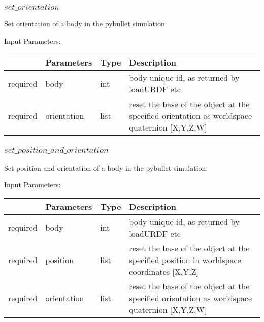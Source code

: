 \documentclass[
	ngerman,
	accentcolor=9c,%
	type=intern,
	marginpar=false
	]{tudapub}
\begin{document}
\vspace{1cm}

\subsubsection{$set\_orientation$}
\noindent Set orientation of a body in the pybullet simulation.

\vspace{0.5cm}
\noindent Input Parameters:
\vspace{0.5cm}

\begin{tabular}{|p{}|p{}|p{}| p{}|}
\hline
 & \textbf{Parameters} & \textbf{Type} & \textbf{Description} \\
\hline
required & body & int & body unique id, as returned by loadURDF etc \\
\hline
required & orientation & list & reset  the base of the object at the specified orientation as worldspace quaternion [X,Y,Z,W] \\
\hline
\end{tabular}

\vspace{1cm}


\subsubsection{$set\_position\_and\_orientation$}
\noindent Set position and orientation of a body in the pybullet simulation.

\vspace{0.5cm}
\noindent Input Parameters:
\vspace{0.5cm}

\begin{tabular}{|p{}|p{}|p{}| p{}|}
\hline
 & \textbf{Parameters} & \textbf{Type} & \textbf{Description} \\
\hline
required & body & int & body unique id, as returned by loadURDF etc \\
\hline
required & position & list & reset the base of the object at the specified position in worldspace coordinates [X,Y,Z] \\
\hline
required & orientation & list & reset  the base of the object at the specified orientation as worldspace quaternion [X,Y,Z,W] \\
\hline
\end{tabular}
\end{document}
